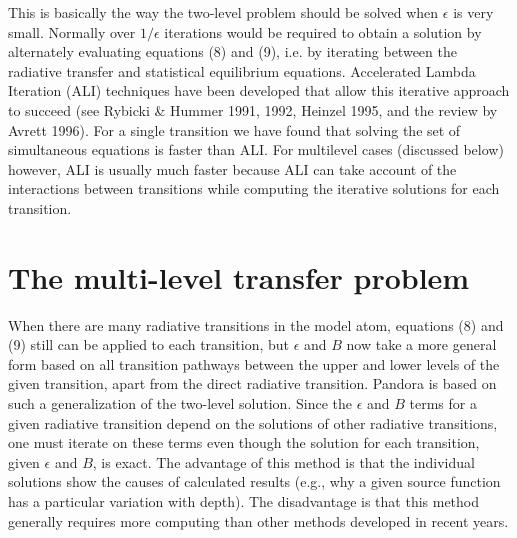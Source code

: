 \documentclass[11pt,twoside]{article}
\begin{document}
This is basically the way the two-level problem should be solved
when $\epsilon$ is very small. Normally over $1/\epsilon$ iterations
would be required to obtain a solution by alternately evaluating
equations (8) and (9), i.e. by iterating between the radiative transfer
and statistical equilibrium equations. Accelerated Lambda Iteration
(ALI) techniques have been developed that allow this iterative
approach to succeed (see Rybicki \& Hummer 1991, 1992, Heinzel 1995,
and the review by Avrett 1996). For a single transition we have
found that solving the set of simultaneous equations is faster than
ALI. For multilevel cases (discussed below) however, ALI is
usually much faster because ALI can take account of the
interactions between transitions while computing the iterative
solutions for each transition.


\section{The multi-level transfer problem}

When there are many radiative transitions in the model atom,
equations (8) and (9) still can be applied
to each transition, but $\epsilon$ and $B$ now take a more
general form based on all transition pathways between the
upper and lower levels of the given transition, apart from
the direct radiative transition. Pandora is based on such a
generalization of the two-level solution. Since the $\epsilon$
and $B$ terms for a given radiative transition depend on the
solutions of other radiative transitions, one must iterate on
these terms even though the solution for each transition, given
$\epsilon$ and $B$, is exact. The advantage of this method is
that the individual solutions show the causes of calculated results
(e.g., why a given source function has a particular variation with
depth). The disadvantage is that this method generally requires
more computing than other methods developed in recent years.
\end{document}
